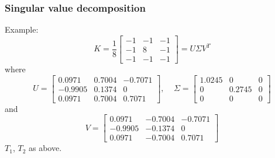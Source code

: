 \documentclass{beamer}
\begin{document}
\begin{frame}
\frametitle{Singular value decomposition}
Example: 
$$
K=\frac{1}{8}
\begin{bmatrix}
-1 & -1 & -1\\
-1 &  8 & -1\\
-1 & -1 & -1
\end{bmatrix}
=U\Sigma V^T
$$
where
$$
U=
\begin{bmatrix}
 0.0971 & 0.7004 & -0.7071\\
-0.9905 & 0.1374 & 0\\
 0.0971 & 0.7004 & 0.7071
\end{bmatrix}
, \ \ \ \ \ \Sigma=
\begin{bmatrix}
1.0245 & 0 & 0\\
0& 0.2745 & 0\\
0 & 0 & 0
\end{bmatrix}
$$
and
$$
V=
\begin{bmatrix}
 0.0971 & -0.7004 & -0.7071\\
-0.9905 & -0.1374 & 0\\
 0.0971 & -0.7004 & 0.7071
\end{bmatrix}
$$
$T_1$, $T_2$ as above.
\end{frame}
\end{document}
